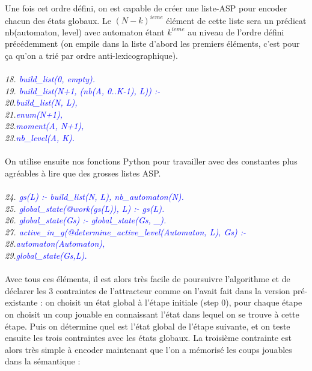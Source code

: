 \documentclass[10pt,a4paper]{article}
\begin{document}
Une fois cet ordre défini, on est capable de créer une liste-ASP pour encoder chacun des états globaux. Le $(N-k)^{ieme}$ élément de cette liste sera un prédicat nb(automaton, level) avec automaton étant $k^{ieme}$ au niveau de 
l'ordre défini précédemment (on empile dans la liste d'abord les premiers éléments, c'est pour ça qu'on a trié par ordre anti-lexicographique).\\ \\
\emph{
	18. \textcolor{blue}{build\_list(0, empty).}\\
	19. \textcolor{blue}{build\_list(N+1, (nb(A, 0..K-1), L)) :-}\\ 
	20.\qquad\textcolor{blue}{build\_list(N, L),}\\
	21.\qquad\textcolor{blue}{enum(N+1),}\\
	22.\qquad\textcolor{blue}{moment(A, N+1),}\\
	23.\qquad\textcolor{blue}{nb\_level(A, K).}\\ \\
}
On utilise ensuite nos fonctions Python pour travailler avec des constantes plus agréables à lire que des grosses listes ASP.\\ \\
\emph{
	24. \textcolor{blue}{gs(L) :- build\_list(N, L), nb\_automaton(N).}\\
	25. \textcolor{blue}{global\_state(@work(gs(L)), L) :- gs(L). }\\ 
	26. \textcolor{blue}{global\_state(Gs) :- global\_state(Gs, \_).}\\
	27. \textcolor{blue}{active\_in\_g(@determine\_active\_level(Automaton, L), Gs) :-}\\
	28.\qquad\textcolor{blue}{automaton(Automaton),}\\
	29.\qquad\textcolor{blue}{global\_state(Gs,L).}\\ \\
}
Avec tous ces éléments, il est alors très facile de poursuivre l'algorithme et de déclarer les 3 contraintes de l'attracteur comme on l'avait fait dans la version pré-existante : on choisit un état global à l'étape initiale 
(step 0), pour chaque étape on choisit un coup jouable en connaissant l'état dans lequel on se trouve à cette étape. Puis on détermine quel est l'état global de l'étape suivante, et on teste ensuite les trois contraintes avec les 
états globaux. La troisième contrainte est alors très simple à encoder maintenant que l'on a mémorisé les coups jouables dans la sémantique :\\ \\
\end{document}
